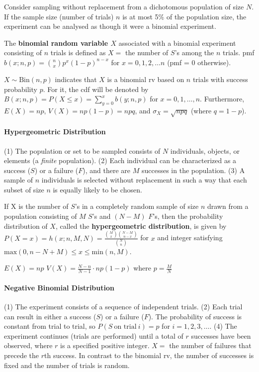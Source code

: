 \documentclass[paper=A4, pagesize, fontsize=6.95pt, DIV=calc]{scrartcl}
\begin{document}
Consider sampling without replacement from a dichotomous population of size $N$. If the sample size (number of trials) $n$ is at most 5\% of the population size, the experiment can be analysed as though it were a binomial experiment.

The \textbf{binomial random variable $X$} associated with a binomial experiment consisting of $n$ trials is defined as $X =$ the number of $S$'s among the $n$ trials. pmf $b(x; n, p) = \binom{n}{x}p^x(1 - p)^{n - x}$ for $x = 0, 1, 2, \ldots n$ (pmf = 0 otherwise).

$X \sim \text{Bin}(n, p)$ indicates that $X$ is a binomial rv based on $n$ trials with success probability $p$. For it, the cdf will be denoted by $B(x; n, p) = P(X \le x) = \sum_{y = 0}^{x}b(y; n, p)$ for $x = 0, 1, \ldots, n$. Furthermore, $E(X) = np$, $V(X) = np(1 - p) = npq$, and $\sigma_X = \sqrt{npq}$ (where $q = 1 - p$).

\paragraph{Hypergeometric Distribution}
(1) The population or set to be sampled consists of $N$ individuals, objects, or elements (a \textit{finite} population). (2) Each individual can be characterized as a success ($S$) or a failure ($F$), and there are $M$ successes in the population. (3) A sample of $n$ individuals is selected without replacement in such a way that each subset of size $n$ is equally likely to be chosen.

If X is the number of $S$'s in a completely random sample of size $n$ drawn from a population consisting of $M$ $S$'s and $(N - M)$ $F$'s, then the probability distribution of $X$, called the \textbf{hypergeometric distribution}, is given by $P(X = x) = h(x; n, M, N) = \frac{\binom{M}{x}\binom{N - M}{n - x}}{\binom{N}{n}}$ for $x$ and integer satisfying $\text{max}(0, n - N + M) \le x \le \text{min}(n, M)$.

$E(X) = np$ \quad $V(X) = \frac{N - n}{N - 1} \cdot np(1 - p)$ where $p = \frac{M}{N}$

\paragraph{Negative Binomial Distribution}
(1) The experiment consists of a sequence of independent trials. (2) Each trial can result in either a success ($S$) or a failure ($F$). The probability of success is constant from trial to trial, so $P(S\ \text{on trial}\ i) = p$ for $i = 1, 2, 3, \ldots$. (4) The experiment continues (trials are performed) until a total of $r$ successes have been observed, where $r$ is a specified positive integer. $X = $ the number of failures that precede the $r$th
success. In contrast to the binomial rv, the number of successes is fixed and the number of trials is random.
\end{document}
